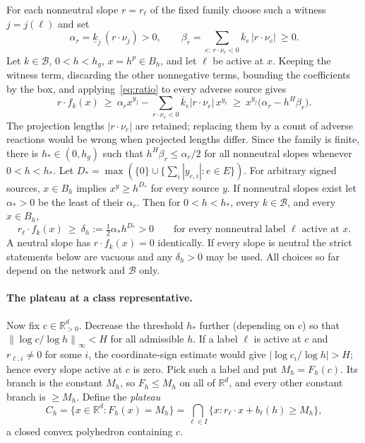 \documentclass[11pt]{article}
\theoremstyle{definition}
\theoremstyle{remark}
\newcommand{\R}{\mathbb R}
\newcommand{\U}{\R_{>0}^{d}}
\newcommand{\B}{\mathcal B}
\newcommand{\norm}[1]{\left\|#1\right\|}
\begin{document}
For each nonneutral slope $r=r_\ell$ of the fixed family choose such a witness
$j=j(\ell)$ and set
\[
 \alpha_r=\underline k_{j}\,(r\cdot\nu_{j})>0,\qquad
 \beta_r=\sum_{e:\,r\cdot\nu_e<0}\overline k_e\,|r\cdot\nu_e|\ \ge0 .
\]
Let $k\in\B$, $0<h<h_g$, $x=h^{p}\in B_h$, and let $\ell$ be active at $x$. Keeping
the witness term, discarding the other nonnegative terms, bounding the coefficients
by the box, and applying~\eqref{eq:ratio} to every adverse source gives
\begin{equation}\label{eq:drift}
 r\cdot f_k(x)\ \ge\ \alpha_r x^{y_j}-\sum_{r\cdot\nu_e<0}\overline k_e|r\cdot\nu_e|\,x^{y_e}
 \ \ge\ x^{y_j}\bigl(\alpha_r-h^{H}\beta_r\bigr).
\end{equation}
The projection lengths $|r\cdot\nu_e|$ are retained; replacing them by a count of
adverse reactions would be wrong when projected lengths differ. Since the family
is finite, there is $h_*\in(0,h_g)$ such that $h^{H}\beta_r\le\alpha_r/2$ for all
nonneutral slopes whenever $0<h<h_*$. Let $D_*=\max(\{0\}\cup\{\sum_i|y_{e,i}|:e\in E\})$.
For arbitrary signed sources, $x\in B_h$ implies $x^{y}\ge h^{D_*}$ for every source
$y$. If nonneutral slopes exist let $\alpha_*>0$ be the least of their $\alpha_r$.
Then for $0<h<h_*$, every $k\in\B$, and every $x\in B_h$,
\begin{equation}\label{eq:margin}
 r_\ell\cdot f_k(x)\ \ge\ \delta_h:=\tfrac12\alpha_*h^{D_*}>0
 \qquad\text{for every nonneutral label $\ell$ active at $x$.}
\end{equation}
A neutral slope has $r\cdot f_k(x)=0$ identically. If every slope is neutral the
strict statements below are vacuous and any $\delta_h>0$ may be used. All choices
so far depend on the network and $\B$ only.

\paragraph{The plateau at a class representative.}
Now fix $c\in\U$. Decrease the threshold $h_*$ further (depending on $c$) so that
$\norm{\log c/\log h}_\infty<H$ for all admissible $h$. If a label $\ell$ is active
at $c$ and $r_{\ell,i}\ne0$ for some $i$, the coordinate-sign estimate would give
$|\log c_i/\log h|>H$; hence every slope active at $c$ is zero. Pick such a label
and put $M_h=F_h(c)$. Its branch is the constant $M_h$, so $F_h\le M_h$ on all of
$\R^d$, and every other constant branch is $\ge M_h$. Define the \emph{plateau}
\begin{equation}\label{eq:plateau}
 C_h=\{x\in\R^d:F_h(x)=M_h\}=\bigcap_{\ell\in I}\{x:r_\ell\cdot x+b_\ell(h)\ge M_h\},
\end{equation}
a closed convex polyhedron containing $c$.
\end{document}
